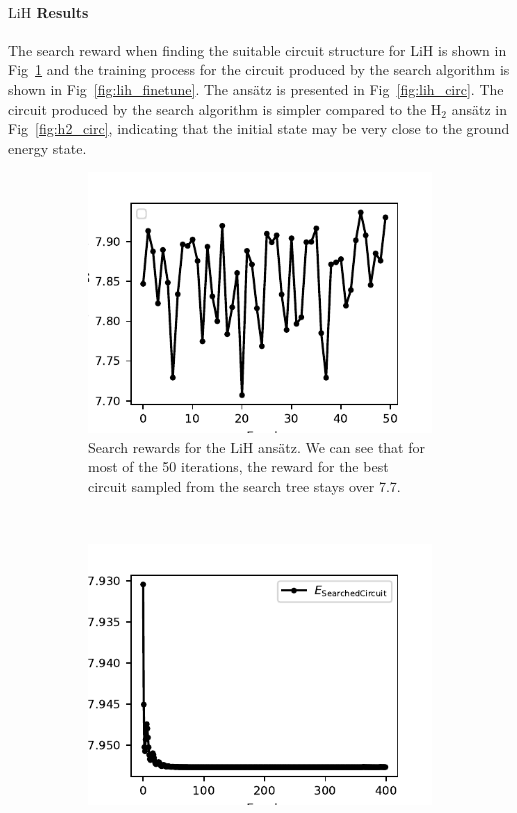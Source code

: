 \documentclass[a4paper,onecolumn,11pt]{quantumarticle}
\begin{document}
\paragraph{$\text{LiH}$ Results} The search reward when finding the suitable circuit structure for LiH is shown in Fig~\ref{fig:lih_search} and the training process for the circuit produced by the search algorithm is shown in Fig~\ref{fig:lih_finetune}. The ans\"atz is presented in Fig~\ref{fig:lih_circ}. The circuit produced by the search algorithm is simpler compared to the $\text{H}_2$ ans\"atz in Fig~\ref{fig:h2_circ}, indicating that the initial state may be very close to the ground energy state.
\begin{figure}[H]
    \centering
    \begin{subfigure}[t]{0.48\linewidth}
        \includegraphics[width=\linewidth]{Figures/fig_lih_search_rewards.pdf}
        \caption{Search rewards for the $\text{LiH}$ ans\"atz. We can see that for most of the 50 iterations, the reward for the best circuit sampled from the search tree stays over 7.7.}
        \label{fig:lih_search}
    \end{subfigure}
    ~ %
    \begin{subfigure}[t]{0.48\linewidth}
        \includegraphics[width=\linewidth]{Figures/fig_lih_fine_tune_loss.pdf}

\end{subfigure}
\end{figure}
\end{document}
